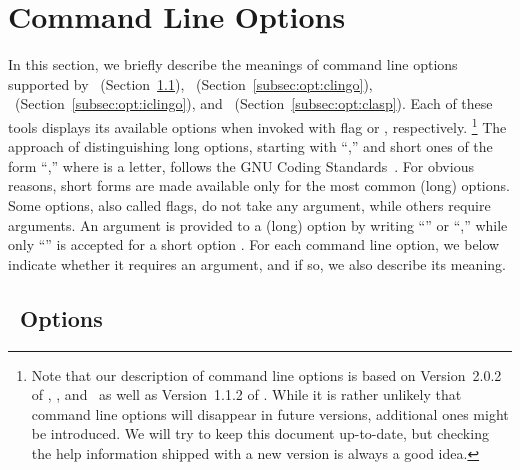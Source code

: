 \section{Command Line Options}\label{sec:options}

In this section, we briefly describe the meanings of
command line options supported by
\gringo\ (Section~\ref{subsec:opt:gringo}),
\clingo\ (Section~\ref{subsec:opt:clingo}),
\iclingo\ (Section~\ref{subsec:opt:iclingo}), and
\clasp\ (Section~\ref{subsec:opt:clasp}).
Each of these tools displays its available options
when invoked with flag  or ,
respectively.%
\footnote{%
  Note that our description of command line options
  is based on Version~2.0.2 of \gringo, \clingo, and \iclingo\
  as well as Version~1.1.2 of \clasp.
  While it is rather unlikely that command line options will
  disappear in future versions,
  additional ones might be introduced.
  We will try to keep this document up-to-date,
  but checking the help information shipped 
  with a new version is always a good idea.}
The approach of distinguishing long options, starting with ``\code{--},''
and short ones of the form ``\code{-\textit{l}},''
where  is a letter,
follows the GNU Coding Standards~\cite{GNUcoding}.
For obvious reasons,
short forms are made available only for the most common (long) options.
Some options, also called flags, do not take any argument,
while others require arguments.
An argument  is provided to a (long) option 
by writing 
``'' or
``,''
while only
``''
is accepted for a short option .
For each command line option,
we below indicate whether it requires an argument,
and if so, we also describe its meaning.


\subsection{\gringo\ Options}\label{subsec:opt:gringo}

